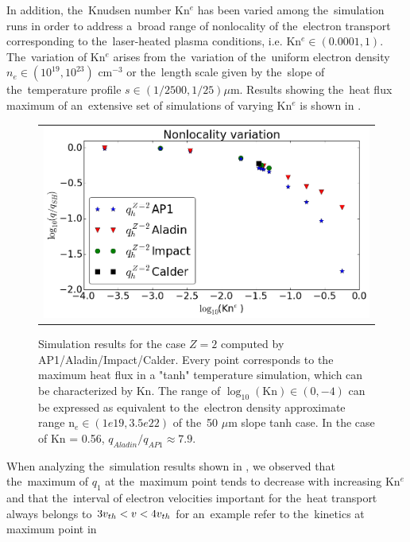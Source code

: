 In addition, the~Knudsen number Kn$^e$ has been varied among the~simulation 
runs in order to address a~broad range of nonlocality of 
the~electron transport corresponding 
to the~laser-heated plasma conditions, i.e. Kn$^e \in (0.0001, 1)$. 
The~variation of Kn$^e$ arises from the~variation
of the~uniform electron density $n_e \in (10^{19}, 10^{23})$ cm$^{-3}$ or 
the~length scale given by the~slope of the~temperature profile 
$s \in (1/2500, 1/25) \mu$m. Results showing the~heat flux maximum 
of an~extensive set of simulations of
varying Kn$^e$ is shown in .
 
\begin{figure}[htb]
  \begin{center}
    \begin{tabular}{c}
      \includegraphics[width=\figscale\textwidth]{Kn_results.png}
    \end{tabular}
  \caption{  
  Simulation results for the case $Z=2$ computed by AP1/Aladin/Impact/Calder.
  Every point corresponds to the maximum heat flux in a "tanh" temperature 
  simulation, which can be characterized by Kn. The range of 
  $\log_{10}(\text{Kn})\in (0, -4)$ can be expressed as equivalent 
  to the~electron density approximate range n$_e \in (1e19, 3.5e22)$ of 
  the~50 $\mu$m slope tanh case. In the case of Kn = 0.56, 
  $q_{Aladin} / q_{AP1}\approx 7.9$.}
  \label{fig:Kn_results}
  \end{center} 
\end{figure}
When analyzing the~simulation results shown in , 
we observed that 
the~maximum of $q_1$ at the~maximum point tends to decrease with increasing 
Kn$^e$ and that the~interval of electron velocities important for 
the~heat transport always belongs to $3 v_{th} < v <4 v_{th}$ for an~example
refer to the~kinetics at maximum point in  
